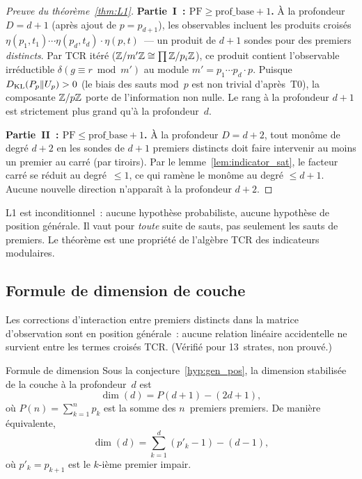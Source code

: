 \documentclass[12pt,a4paper]{article}
\begin{document}
\begin{proof}[Preuve du théorème~\ref{thm:L1}]
\textbf{Partie~I~: $\mathrm{PF} \ge \mathrm{prof\_base} + 1$.}\quad
À la profondeur $D = d{+}1$ (après ajout de $p = p_{d+1}$), les
observables incluent les produits croisés
$\eta(p_1, t_1) \cdots \eta(p_d, t_d) \cdot \eta(p, t)$~--- un
produit de $d{+}1$ sondes pour des premiers \emph{distincts}. Par
TCR itéré ($\mathbb{Z}/m'\mathbb{Z} \cong \prod \mathbb{Z}/p_i\mathbb{Z}$), ce produit contient
l'observable irréductible $\delta(g \equiv r \bmod m')$ au module
$m' = p_1 \cdots p_d \cdot p$. Puisque $D_{\mathrm{KL}}(P_p \| U_p) > 0$ (le
biais des sauts mod~$p$ est non trivial d'après~T0), la composante
$\mathbb{Z}/p\mathbb{Z}$ porte de l'information non nulle. Le rang à la profondeur
$d{+}1$ est strictement plus grand qu'à la profondeur~$d$.

\textbf{Partie~II~: $\mathrm{PF} \le \mathrm{prof\_base} + 1$.}\quad
À la profondeur $D = d{+}2$, tout monôme de degré $d{+}2$ en les
sondes de $d{+}1$ premiers distincts doit faire intervenir au moins
un premier au carré (par tiroirs). Par le
lemme~\ref{lem:indicator_sat}, le facteur carré se réduit au
degré~$\le 1$, ce qui ramène le monôme au degré $\le d{+}1$. Aucune
nouvelle direction n'apparaît à la profondeur $d{+}2$.
\end{proof}

\begin{remarque}
L1 est inconditionnel~: aucune hypothèse probabiliste, aucune
hypothèse de position générale. Il vaut pour \emph{toute} suite de
sauts, pas seulement les sauts de premiers. Le théorème est une
propriété de l'algèbre TCR des indicateurs modulaires.
\end{remarque}


\subsection{Formule de dimension de couche}
\label{sec:PM_dim}

\begin{conjecture}
\label{hyp:gen_pos}
Les corrections d'interaction entre premiers distincts dans la
matrice d'observation sont en position générale~: aucune relation
linéaire accidentelle ne survient entre les termes croisés TCR.
(Vérifié pour 13~strates, non prouvé.)
\end{conjecture}

\begin{thmbox}{Formule de dimension}
\label{thm:dim_formula}
Sous la conjecture~\ref{hyp:gen_pos}, la dimension stabilisée de la
couche à la profondeur~$d$ est
\[
  \dim(d) = P(d{+}1) - (2d{+}1),
\]
où $P(n) = \sum_{k=1}^{n} p_k$ est la somme des $n$~premiers premiers.
De manière équivalente,
\[
  \dim(d) = \sum_{k=1}^{d} (p'_k - 1) - (d - 1),
\]
où $p'_k = p_{k+1}$ est le $k$-ième premier impair.
\end{thmbox}
\end{document}
